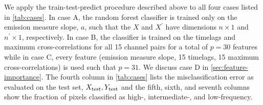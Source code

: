 We apply the train-test-predict procedure described above to all four cases listed in \autoref{tab:cases}. In case A, the random forest classifier is trained only on the emission measure slope, $a$, such that the $X$ and $X^\prime$ have dimensions $n\times1$ and $n^\prime\times1$, respectively. In case B, the classifier is trained on the timelags and maximum cross-correlations for all 15 channel pairs for a total of $p=30$ features while in case C, every feature (emission measure slope, 15 timelags, 15 maximum cross-correlations) is used such that $p=31$. We discuss case D in \autoref{sec:feature-importance}. The fourth column in \autoref{tab:cases} lists the misclassification error as evaluated on the test set, $X_\textup{test},Y_\textup{test}$ and the fifth, sixth, and seventh columns show the fraction of pixels classified as high-, intermediate-, and low-frequency.

